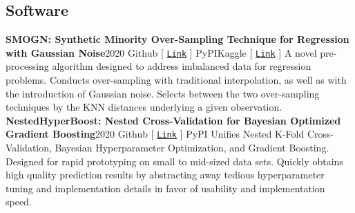 \documentclass{article}
\begin{document}
\begin{bgbox}[
        height = \paperheight,
        width = 0.69\textwidth,
        colback = white
    ]
{            \section*{Software}
            \textbf{SMOGN: Synthetic Minority Over-Sampling Technique for Regression with Gaussian Noise}\hfill{2020}\newline
            \faGithub\space Github [ \href{https://github.com/nickkunz/smogn}{\texttt{Link}} ] \space\faPython\space PyPI\space\faUsers\space Kaggle [ \href{https://www.kaggle.com/aleksandradeis/regression-addressing-extreme-rare-cases}{\texttt{Link}} ]\newline\newline
            A novel pre-processing algorithm designed to address imbalanced data for regression problems. Conducts over-sampling with traditional interpolation, as well as with the introduction of Gaussian noise. Selects between the two over-sampling techniques by the KNN distances underlying a given observation.\newline\newline
            \textbf{NestedHyperBoost: Nested Cross-Validation for Bayesian Optimized Gradient Boosting}\hfill{2020}\newline
            \faGithub\space Github [ \href{https://github.com/nickkunz/nestedhyperboost}{\texttt{Link}} ] \space\faPython\space PyPI\newline\newline
            Unifies Nested K-Fold Cross-Validation, Bayesian Hyperparameter Optimization, and Gradient Boosting. Designed for rapid prototyping on small to mid-sized data sets. Quickly obtains high quality prediction results by abstracting away tedious hyperparameter tuning and implementation details in favor of usability and implementation speed.
}
\end{bgbox}
\end{document}
